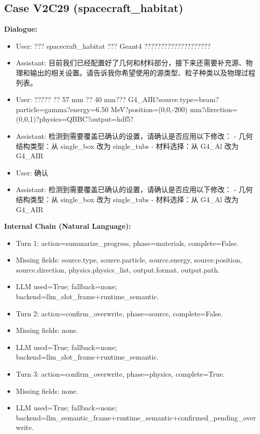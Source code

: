 \documentclass[11pt]{ctexart}
\begin{document}
\subsection{Case V2C29 (spacecraft\_habitat)}
\textbf{Dialogue:}
\begin{itemize}
\item User: ??? spacecraft\_habitat ??? Geant4 ????????????????????
\item Assistant: 目前我们已经配置好了几何和材料部分，接下来还需要补充源、物理和输出的相关设置。请告诉我你希望使用的源类型、粒子种类以及物理过程列表。
\item User: ????? ?? 57 mm ?? 40 mm??? G4\_AIR?source.type=beam?particle=gamma?energy=6.50 MeV?position=(0,0,-200) mm?direction=(0,0,1)?physics=QBBC?output=hdf5?
\item Assistant: 检测到需要覆盖已确认的设置，请确认是否应用以下修改：
- 几何结构类型：从 single\_box 改为 single\_tubs
- 材料选择：从 G4\_Al 改为 G4\_AIR
\item User: 确认
\item Assistant: 检测到需要覆盖已确认的设置，请确认是否应用以下修改：
- 几何结构类型：从 single\_box 改为 single\_tubs
- 材料选择：从 G4\_Al 改为 G4\_AIR
\end{itemize}
\textbf{Internal Chain (Natural Language):}
\begin{itemize}
\item Turn 1: action=summarize\_progress, phase=materials, complete=False.
\item Missing fields: source.type, source.particle, source.energy, source.position, source.direction, physics.physics\_list, output.format, output.path.
\item LLM used=True; fallback=none; backend=llm\_slot\_frame+runtime\_semantic.
\item Turn 2: action=confirm\_overwrite, phase=source, complete=False.
\item Missing fields: none.
\item LLM used=True; fallback=none; backend=llm\_slot\_frame+runtime\_semantic.
\item Turn 3: action=confirm\_overwrite, phase=physics, complete=True.
\item Missing fields: none.
\item LLM used=True; fallback=none; backend=llm\_semantic\_frame+runtime\_semantic+confirmed\_pending\_overwrite.
\end{itemize}
\end{document}
